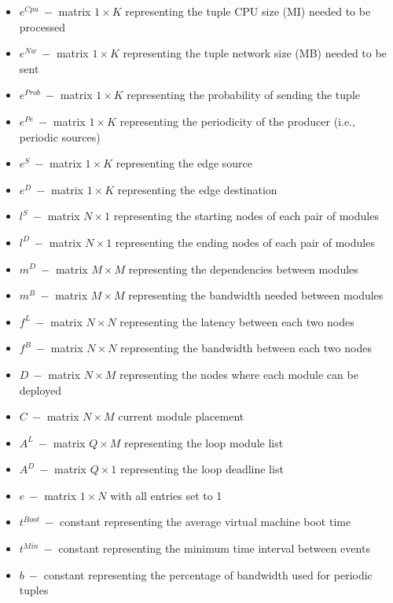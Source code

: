 \documentclass{article}
\begin{document}
\begin{itemize}
	\item $e^{Cpu}~-$ matrix $1\times K$ representing the tuple CPU size (MI) needed to be processed
	\item $e^{Nw}~-$ matrix $1\times K$ representing the tuple network size (MB) needed to be sent
	\item $e^{Prob}~-$ matrix $1\times K$ representing the probability of sending the tuple
	\item $e^{Pe}~-$ matrix $1\times K$ representing the periodicity of the producer (i.e., periodic sources)
	\item $e^{S}~-$ matrix $1\times K$ representing the edge source
	\item $e^{D}~-$ matrix $1\times K$ representing the edge destination\\
	
	\item $l^S~-$ matrix $N\times 1$ representing the starting nodes of each pair of modules
	\item $l^D~-$ matrix $N\times 1$ representing the ending nodes of each pair of modules\\
	
	\item $m^D~-$ matrix $M\times M$ representing the dependencies between modules
	\item $m^B~-$ matrix $M\times M$ representing the bandwidth needed between modules\\
	
	\item $f^L~-$ matrix $N\times N$ representing the latency between each two nodes
	\item $f^B~-$ matrix $N\times N$ representing the bandwidth between each two nodes\\
	
	\item $D~-$ matrix $N\times M$ representing the nodes where each module can be deployed
	\item $C~-$ matrix $N\times M$ current module placement\\
	
	\item $A^L~-$ matrix $Q\times M$ representing the loop module list
	\item $A^D~-$ matrix $Q\times 1$ representing the loop deadline list\\
	
	\item $e~-$ matrix $1\times N$ with all entries set to 1\\
	
	\item $t^{Boot}~-$ constant representing the average virtual machine boot time
	\item $t^{Min}~-$ constant representing the minimum time interval between events
	\item $b~-$ constant representing the percentage of bandwidth used for periodic tuples
\end{itemize}
\end{document}
